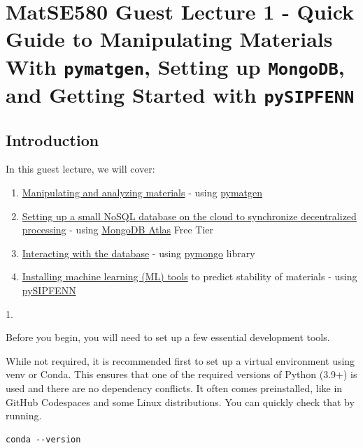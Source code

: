 \chapter{MatSE580 Guest Lecture 1 - Quick Guide to Manipulating Materials With \texttt{pymatgen}, Setting up \texttt{MongoDB}, and Getting Started with \texttt{pySIPFENN}} 
\label{chap:pysipfenntutorial1} 

\hypertarget{introduction}{%
\section{Introduction}\label{pysipfenntutorial:introduction}}

In this guest lecture, we will cover: 

\begin{enumerate}
    \item \protect\hyperlink{Manipulating-and-analyzing-materials}{Manipulating and analyzing materials} - using \href{https://github.com/materialsproject/pymatgen}{pymatgen}

    \item \protect\hyperlink{Setting-up-MongoDB}{Setting up a small NoSQL database on the cloud to synchronize decentralized processing} - using \href{https://www.mongodb.com/atlas}{MongoDB Atlas} Free Tier 

    \item \protect\hyperlink{pymongo}{Interacting with the database} - using \href{https://github.com/mongodb/mongo-python-driver}{pymongo} library

    \item \protect\hyperlink{pysipfenn-install}{Installing machine learning (ML) tools} to predict stability of materials - using \href{https://pysipfenn.readthedocs.io/en/stable/}{pySIPFENN}
\end{enumerate}1.

Before you begin, you will need to set up a few essential development
tools.

While not required, it is recommended first to set up a virtual
environment using venv or Conda. This ensures that one of the required
versions of Python (3.9+) is used and there are no dependency conflicts.
It often comes preinstalled, like in GitHub Codespaces and some Linux
distributions. You can quickly check that by running.

\begin{verbatim}
conda --version
\end{verbatim}

